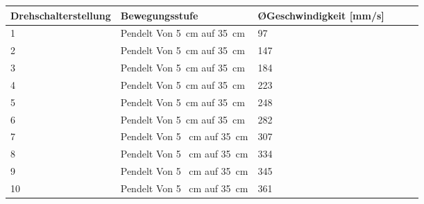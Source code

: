 \documentclass[12pt,a4paper]{scrbook}
\begin{document}
\fontsize{8}{10}\selectfont
\begin{tabularx}{\textwidth}{|p{3cm}|X|X|X|p{1cm}|X|}
	\hline 
	\textbf{Drehschalterstellung}  & \textbf{Bewegungsstufe} & \textbf{ \O Geschwindigkeit [mm/s]}    \\ \hline
	1 & Pendelt Von 5\ cm auf 35\ cm & 97   \\
	\hline
	2 & Pendelt Von 5\ cm auf 35\ cm & 147 \\
	\hline
	3 & Pendelt Von 5\ cm auf 35\ cm & 184 \\
	\hline
	4 & Pendelt Von 5\ cm auf 35\ cm & 223 \\
	\hline
	5 & Pendelt Von 5\ cm auf 35\ cm & 248 \\
	\hline
	6 & Pendelt Von 5\ cm auf 35\ cm & 282 \\
	\hline
	7 & Pendelt Von 5 \ cm auf 35\ cm & 307 \\
	\hline
	8 & Pendelt Von 5 \ cm auf 35\ cm & 334\\
	\hline
	9 & Pendelt Von 5 \ cm auf 35\ cm & 345 \\
	\hline
	10 & Pendelt Von 5 \ cm auf 35\ cm & 361 \\
	\hline
	
	
\end{tabularx}	

		
\end{document}
